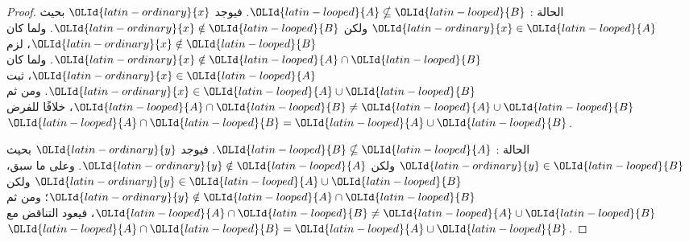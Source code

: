 \documentclass[../../../include/open-logic-section]{subfiles}
\begin{document}
\begin{proof}
  الحالة : ${\OLId{latin-looped}{A}} \nsubseteq {\OLId{latin-looped}{B}}$. فيوجد ${\OLId{latin-ordinary}{x}}$ بحيث ${\OLId{latin-ordinary}{x}} \in {\OLId{latin-looped}{A}}$ ولكن
  ${\OLId{latin-ordinary}{x}} \notin {\OLId{latin-looped}{B}}$. ولما كان ${\OLId{latin-ordinary}{x}} \notin {\OLId{latin-looped}{B}}$، لزم ${\OLId{latin-ordinary}{x}} \notin {\OLId{latin-looped}{A}} \cap {\OLId{latin-looped}{B}}$.
  ولما كان ${\OLId{latin-ordinary}{x}} \in {\OLId{latin-looped}{A}}$، ثبت ${\OLId{latin-ordinary}{x}} \in {\OLId{latin-looped}{A}} \cup {\OLId{latin-looped}{B}}$. ومن ثم
  ${\OLId{latin-looped}{A}} \cap {\OLId{latin-looped}{B}} \neq {\OLId{latin-looped}{A}} \cup {\OLId{latin-looped}{B}}$، خلافًا للفرض
  ${\OLId{latin-looped}{A}} \cap {\OLId{latin-looped}{B}} = {\OLId{latin-looped}{A}} \cup {\OLId{latin-looped}{B}}$.

  الحالة : ${\OLId{latin-looped}{B}} \nsubseteq {\OLId{latin-looped}{A}}$. فيوجد ${\OLId{latin-ordinary}{y}}$ بحيث ${\OLId{latin-ordinary}{y}} \in {\OLId{latin-looped}{B}}$ ولكن
  ${\OLId{latin-ordinary}{y}} \notin {\OLId{latin-looped}{A}}$. وعلى ما سبق، ${\OLId{latin-ordinary}{y}} \in {\OLId{latin-looped}{A}} \cup {\OLId{latin-looped}{B}}$ ولكن
  ${\OLId{latin-ordinary}{y}} \notin {\OLId{latin-looped}{A}} \cap {\OLId{latin-looped}{B}}$؛ ومن ثم ${\OLId{latin-looped}{A}} \cap {\OLId{latin-looped}{B}} \neq {\OLId{latin-looped}{A}} \cup {\OLId{latin-looped}{B}}$، فيعود
  التناقض مع ${\OLId{latin-looped}{A}} \cap {\OLId{latin-looped}{B}} = {\OLId{latin-looped}{A}} \cup {\OLId{latin-looped}{B}}$.
\end{proof}
\end{document}
